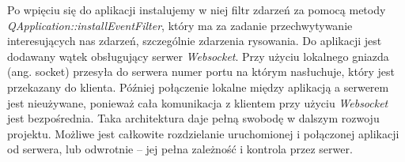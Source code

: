 Po wpięciu się do aplikacji instalujemy w niej filtr zdarzeń za pomocą metody \emph{QApplication::installEventFilter}, który ma za zadanie przechwytywanie interesujących nas zdarzeń, szczególnie zdarzenia rysowania.
Do aplikacji jest dodawany wątek obsługujący serwer \emph{Websocket}. Przy użyciu lokalnego gniazda (ang. socket) przesyła do serwera numer portu na którym nasłuchuje, który jest przekazany do klienta. Później połączenie lokalne między aplikacją a serwerem jest nieużywane, ponieważ cała komunikacja z klientem przy użyciu \emph{Websocket} jest bezpośrednia. Taka architektura daje pełną swobodę w dalszym rozwoju projektu. Możliwe jest całkowite rozdzielanie uruchomionej i połączonej aplikacji od serwera, lub odwrotnie -- jej pełna zależność i kontrola przez serwer.